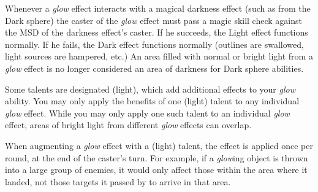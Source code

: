 {	\par Whenever a \textit{glow} effect interacts with a magical darkness effect (such as from the Dark sphere) the caster of the \textit{glow} effect must pass a magic skill check against the MSD of the darkness effect’s caster. If he succeeds, the Light effect functions normally. If he fails, the Dark effect functions normally (outlines are swallowed, light sources are hampered, etc.) An area filled with normal or bright light from a \textit{glow} effect is no longer considered an area of darkness for Dark sphere abilities.
	\par Some talents are designated (light), which add additional effects to your \textit{glow} ability. You may only apply the benefits of one (light) talent to any individual \textit{glow} effect. While you may only apply one such talent to an individual \textit{glow} effect, areas of bright light from different \textit{glow} effects can overlap. 
	\par When augmenting a \textit{glow} effect with a (light) talent, the effect is applied once per round, at the end of the caster’s turn. For example, if a \textit{glow}ing object is thrown into a large group of enemies, it would only affect those within the area where it landed, not those targets it passed by to arrive in that area.}
